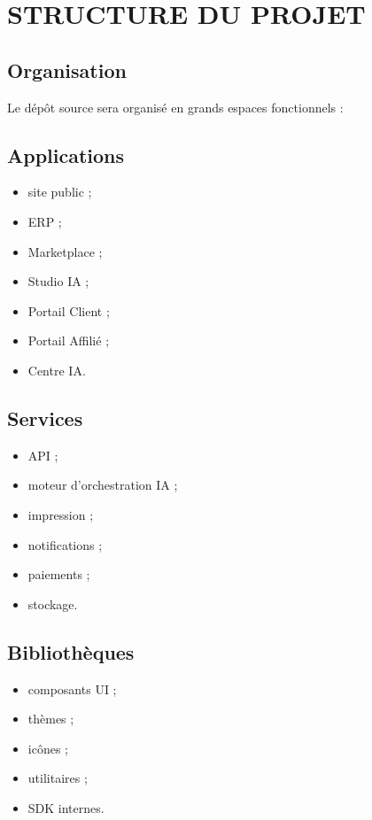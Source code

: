 \documentclass[12pt,a4paper,oneside]{book}
\begin{document}
\appendix

\chapter{STRUCTURE DU PROJET}

\section{Organisation}
Le dépôt source sera organisé en grands espaces fonctionnels :

\section{Applications}
\begin{itemize}
\item site public ;
\item ERP ;
\item Marketplace ;
\item Studio IA ;
\item Portail Client ;
\item Portail Affilié ;
\item Centre IA.
\end{itemize}

\section{Services}
\begin{itemize}
\item API ;
\item moteur d'orchestration IA ;
\item impression ;
\item notifications ;
\item paiements ;
\item stockage.
\end{itemize}

\section{Bibliothèques}
\begin{itemize}
\item composants UI ;
\item thèmes ;
\item icônes ;
\item utilitaires ;
\item SDK internes.
\end{itemize}
\end{document}
